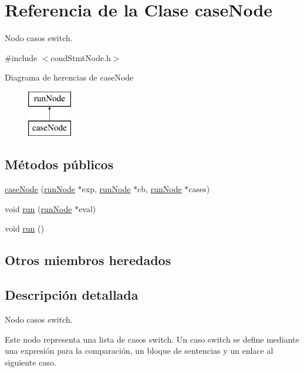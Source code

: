 \hypertarget{classcaseNode}{\section{Referencia de la Clase case\-Node}
\label{classcaseNode}
}


Nodo casos switch.  




{\ttfamily \#include $<$cond\-Stmt\-Node.\-h$>$}

Diagrama de herencias de case\-Node\begin{figure}[H]
\begin{center}
\leavevmode
\includegraphics[height=2.000000cm]{classcaseNode}
\end{center}
\end{figure}
\subsection*{Métodos públicos}
\begin{DoxyCompactItemize}
\item 
\hyperlink{classcaseNode_a60431935cac670348d1af79dbc3fb58f}{case\-Node} (\hyperlink{classrunNode}{run\-Node} $\ast$exp, \hyperlink{classrunNode}{run\-Node} $\ast$cb, \hyperlink{classrunNode}{run\-Node} $\ast$cases)
\item 
void \hyperlink{classcaseNode_a10345cc86f9dec3ead3a71cc4d2fb2fa}{run} (\hyperlink{classrunNode}{run\-Node} $\ast$eval)
\item 
void \hyperlink{classcaseNode_a257a849756f7bcd0ccb0dc41a62783d9}{run} ()
\end{DoxyCompactItemize}
\subsection*{Otros miembros heredados}


\subsection{Descripción detallada}
Nodo casos switch. 

Este nodo representa una lista de casos switch. Un caso switch se define mediante una expresión para la comparación, un bloque de sentencias y un enlace al siguiente caso.

